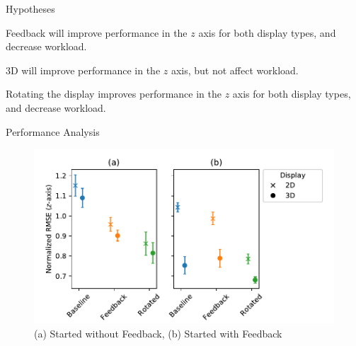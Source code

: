 \documentclass[10pt]{beamer}
\begin{document}
\begin{frame}[fragile]{Hypotheses}
  \begin{description}[align=left]
    \item [H1] Feedback will improve performance in the $z$ axis for both display types, and decrease workload.
    \item [H2] 3D will improve performance in the $z$ axis, but not affect workload.
    \item [H3] Rotating the display improves performance in the $z$ axis for both display types, and decrease workload.
  \end{description}
\end{frame}

\begin{frame}[fragile]{Performance Analysis}
\begin{figure}
  \begin{center}
    \includegraphics[width=\linewidth]{../img/x_design_y_zrmse_hue_device_col_cbf_first.pdf}\\
    (a) Started without Feedback, (b) Started with Feedback
  \end{center}
\end{figure}
\end{frame}
\end{document}
